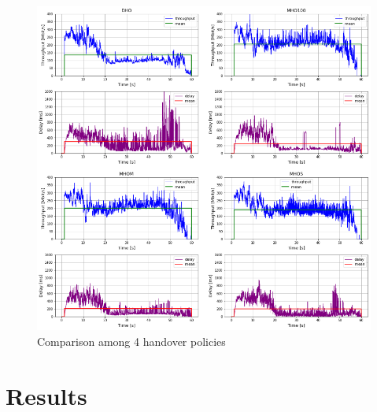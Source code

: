 \documentclass[conference,10pt]{IEEEtran}
\begin{document}
\begin{figure}[h] \label{fig:4pol}
	\begin{center}
		\includegraphics[scale=0.85]{images/confronto.png}
		\caption{Comparison among 4 handover policies}
	\end{center}
\end{figure}


\section{Results}\label{sec:res}
\end{document}

